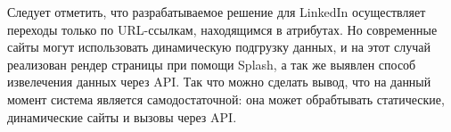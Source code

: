 Следует отметить, что разрабатываемое решение для LinkedIn осуществляет переходы только по URL-ссылкам, находящимся в атрибутах.
Но современные сайты могут использовать динамическую подгрузку данных, и на этот случай реализован рендер страницы при помощи 
Splash, а так же выявлен способ извелечения данных через API. Так что можно сделать вывод, что на данный момент система является
самодостаточной: она может обрабтывать статические, динамические сайты и вызовы через API.